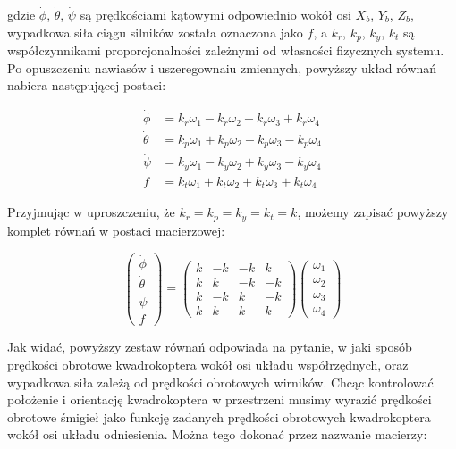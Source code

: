 gdzie $\dot{\phi}$, $\dot{\theta}$, $\dot{\psi}$ są prędkościami kątowymi odpowiednio wokół osi $X_b$, $Y_b$, $Z_b$, wypadkowa siła ciągu silników została oznaczona jako $f$, a $k_r$, $k_p$, $k_y$, $k_t$ są współczynnikami proporcjonalności zależnymi od własności fizycznych systemu. Po opuszczeniu nawiasów i uszeregownaiu zmiennych, powyższy układ równań nabiera następującej postaci:

\begin{equation}
\begin{aligned}
	\dot{\phi} &= k_r\omega_1 - k_r\omega_2 - k_r\omega_3 + k_r\omega_4 \\
	\dot{\theta} &= k_p\omega_1 + k_p\omega_2 - k_p\omega_3 - k_p\omega_4 \\
	\dot{\psi} &= k_y\omega_1 - k_y\omega_2 + k_y\omega_3 - k_y\omega_4 \\
	f &= k_t\omega_1 + k_t\omega_2 + k_t\omega_3 + k_t\omega_4
\end{aligned}
\end{equation}



Przyjmując w uproszczeniu, że $k_r = k_p = k_y = k_t = k$, możemy zapisać powyższy komplet równań w postaci macierzowej:

\begin{equation}
	\label{eq:omega_as_argument}
	\begin{pmatrix}
		\dot{\phi} \\
		\dot{\theta} \\
		\dot{\psi} \\
		f
	\end{pmatrix} = 
	\begin{pmatrix}
		k & -k & -k & k \\
		k & k & -k & -k \\
		k & -k & k & -k \\
		k & k & k & k
	\end{pmatrix}
	\begin{pmatrix}
		\omega_1 \\
		\omega_2 \\
		\omega_3 \\
		\omega_4
	\end{pmatrix}
\end{equation}

Jak widać, powyższy zestaw równań odpowiada na pytanie, w jaki sposób prędkości obrotowe kwadrokoptera wokół osi układu współrzędnych, oraz wypadkowa siła zależą od prędkości obrotowych wirników. Chcąc kontrolować położenie i orientację kwadrokoptera w przestrzeni musimy wyrazić prędkości obrotowe śmigieł jako funkcję zadanych prędkości obrotowych kwadrokoptera wokół osi układu odniesienia. Można tego dokonać przez nazwanie macierzy:

